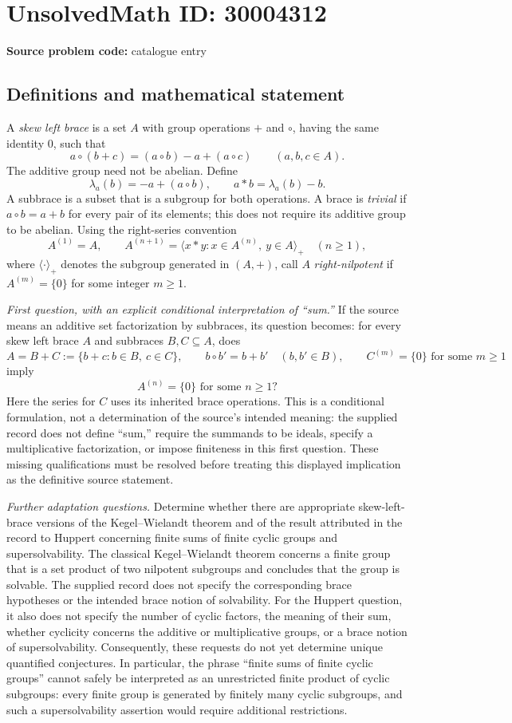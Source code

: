 \documentclass[11pt]{article}
\begin{document}
\section*{UnsolvedMath ID: 30004312}
\textbf{Source problem code:} catalogue entry
\subsection{Definitions and mathematical statement}
A \emph{skew left brace} is a set \(A\) with group operations \(+\) and \(\circ\), having the same identity \(0\), such that
\[
a\circ(b+c)=(a\circ b)-a+(a\circ c)
\qquad(a,b,c\in A).
\]
The additive group need not be abelian. Define
\[
\lambda_a(b)=-a+(a\circ b),\qquad a*b=\lambda_a(b)-b.
\]
A subbrace is a subset that is a subgroup for both operations. A brace is \emph{trivial} if \(a\circ b=a+b\) for every pair of its elements; this does not require its additive group to be abelian. Using the right-series convention
\[
A^{(1)}=A,\qquad
A^{(n+1)}=\bigl\langle x*y:x\in A^{(n)},\ y\in A\bigr\rangle_{+}
\quad(n\geq1),
\]
where \(\langle\cdot\rangle_{+}\) denotes the subgroup generated in \((A,+)\), call \(A\) \emph{right-nilpotent} if \(A^{(m)}=\{0\}\) for some integer \(m\geq1\).

\emph{First question, with an explicit conditional interpretation of ``sum.''} If the source means an additive set factorization by subbraces, its question becomes: for every skew left brace \(A\) and subbraces \(B,C\subseteq A\), does
\[
A=B+C:=\{b+c:b\in B,\ c\in C\},\qquad
b\circ b'=b+b'\quad(b,b'\in B),\qquad
C^{(m)}=\{0\}\text{ for some }m\geq1
\]
imply
\[
A^{(n)}=\{0\}\text{ for some }n\geq1?
\]
Here the series for \(C\) uses its inherited brace operations. This is a conditional formulation, not a determination of the source's intended meaning: the supplied record does not define ``sum,'' require the summands to be ideals, specify a multiplicative factorization, or impose finiteness in this first question. These missing qualifications must be resolved before treating this displayed implication as the definitive source statement.

\emph{Further adaptation questions.} Determine whether there are appropriate skew-left-brace versions of the Kegel--Wielandt theorem and of the result attributed in the record to Huppert concerning finite sums of finite cyclic groups and supersolvability. The classical Kegel--Wielandt theorem concerns a finite group that is a set product of two nilpotent subgroups and concludes that the group is solvable. The supplied record does not specify the corresponding brace hypotheses or the intended brace notion of solvability. For the Huppert question, it also does not specify the number of cyclic factors, the meaning of their sum, whether cyclicity concerns the additive or multiplicative groups, or a brace notion of supersolvability. Consequently, these requests do not yet determine unique quantified conjectures. In particular, the phrase ``finite sums of finite cyclic groups'' cannot safely be interpreted as an unrestricted finite product of cyclic subgroups: every finite group is generated by finitely many cyclic subgroups, and such a supersolvability assertion would require additional restrictions.
\end{document}

